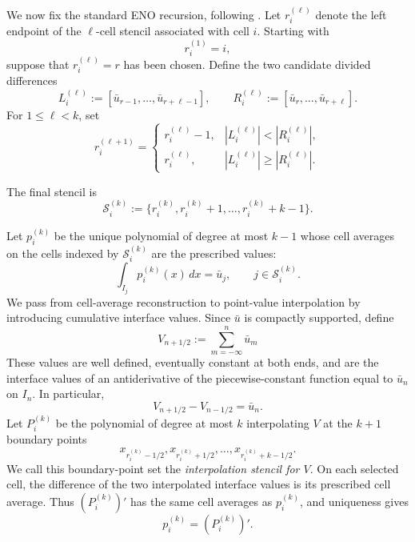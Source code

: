 \documentclass[11pt]{amsart}
\theoremstyle{plain}
\theoremstyle{definition}
\theoremstyle{remark}
\numberwithin{equation}{section}
\theoremstyle{plain}
\begin{document}
We now fix the standard ENO recursion, following \cite{FMT}.  Let $r_i^{(\ell)}$ denote the left
endpoint of the $\ell$-cell stencil associated with cell $i$.  Starting with
\begin{equation}\label{eq:eno-initial-endpoint}
	r_i^{(1)}=i,
\end{equation}
suppose that $r_i^{(\ell)}=r$ has been chosen.  Define the two candidate
divided differences
\begin{equation}\label{eq:eno-candidates}
	L_i^{(\ell)}
	:=[\bar u_{r-1},\ldots,\bar u_{r+\ell-1}],
	\qquad
	R_i^{(\ell)}
	:=[\bar u_r,\ldots,\bar u_{r+\ell}].
\end{equation}
For $1\le \ell<k$, set
\begin{equation}\label{eq:eno-endpoint-recursion}
	r_i^{(\ell+1)}
	=
	\begin{cases}
		r_i^{(\ell)}-1,
		& |L_i^{(\ell)}|<|R_i^{(\ell)}|,\\[2mm]
		r_i^{(\ell)},
		& |L_i^{(\ell)}|\ge |R_i^{(\ell)}|.
	\end{cases}
\end{equation}

The final stencil is
\begin{equation}\label{eq:final-eno-stencil}
	\mathcal S_i^{(k)}
	:=\{r_i^{(k)},r_i^{(k)}+1,\ldots,r_i^{(k)}+k-1\}.
\end{equation}

Let $p_i^{(k)}$ be the unique polynomial of degree at most $k-1$ whose cell
averages on the cells indexed by $\mathcal S_i^{(k)}$ are the prescribed
values:
\begin{equation}\label{eq:reconstruction-cell-averages}
	\int_{I_j}p_i^{(k)}(x)\,dx=\bar u_j,
	\qquad j\in\mathcal S_i^{(k)}.
\end{equation}
We pass from cell-average reconstruction to point-value interpolation by
introducing cumulative interface values.  Since $\bar u$ is compactly
supported, define
\begin{equation}\label{eq:discrete-primitive}
	V_{n+1/2}:=\sum_{m=-\infty}^{n}\bar u_m
\end{equation}
These values are well defined, eventually constant at both ends, and are
the interface values of an antiderivative of the piecewise-constant function
equal to $\bar u_n$ on $I_n$.  In particular,
\[
V_{n+1/2}-V_{n-1/2}=\bar u_n.
\]
Let $P_i^{(k)}$ be the polynomial of degree at most $k$ interpolating $V$ at
the $k+1$ boundary points
\begin{equation}\label{eq:primitive-stencil}
	x_{r_i^{(k)}-1/2},x_{r_i^{(k)}+1/2},\ldots,
	x_{r_i^{(k)}+k-1/2}.
\end{equation}
We call this boundary-point set the \emph{interpolation stencil for
$V$}.  On each selected cell, the difference of the two interpolated
interface values is its prescribed cell average.  Thus $(P_i^{(k)})'$ has the
same cell averages as $p_i^{(k)}$, and uniqueness gives
\begin{equation}\label{eq:reconstruction-as-derivative}
	p_i^{(k)}=(P_i^{(k)})'.
\end{equation}
\end{document}
